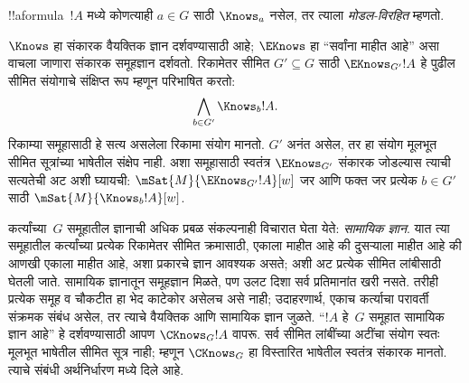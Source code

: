 \documentclass[../../../include/open-logic-section]{subfiles}
\begin{document}
!!a{formula}~$!A$ मध्ये कोणत्याही $a\in G$ साठी
$\Knows_a$ नसेल, तर त्याला \emph{मोडल-विरहित} म्हणतो.

\begin{defn}
  $\Knows$ हा संकारक वैयक्तिक ज्ञान दर्शवण्यासाठी
  आहे; $\EKnows$ हा ``सर्वांना माहीत आहे'' असा
  वाचला जाणारा संकारक समूहज्ञान दर्शवतो. रिकामेतर
  सीमित $G' \subseteq G$ साठी $\EKnows_{G'} !A$ हे
  पुढील सीमित संयोगाचे संक्षिप्त रूप म्हणून परिभाषित करतो:
  \[\bigwedge_{b \in G'} \Knows_b !A.\]
  रिकाम्या समूहासाठी हे सत्य असलेला रिकामा संयोग मानतो.
  $G'$ अनंत असेल, तर हा संयोग मूलभूत सीमित सूत्रांच्या भाषेतील
  संक्षेप नाही. अशा समूहासाठी स्वतंत्र $\EKnows_{G'}$
  संकारक जोडल्यास त्याची सत्यतेची अट अशी घ्यायची:
  $\mSat{M}{\EKnows_{G'} !A}[w]$ जर आणि फक्त जर
  प्रत्येक $b\in G'$ साठी $\mSat{M}{\Knows_b !A}[w]$.
\end{defn}

कर्त्यांच्या~$G$ समूहातील ज्ञानाची अधिक प्रबळ
संकल्पनाही विचारात घेता येते: \emph{सामायिक ज्ञान}.
यात त्या समूहातील कर्त्यांच्या प्रत्येक रिकामेतर सीमित
क्रमासाठी, एकाला माहीत आहे की दुसऱ्याला माहीत आहे की
आणखी एकाला माहीत आहे, अशा प्रकारचे ज्ञान आवश्यक असते;
अशी अट प्रत्येक सीमित लांबीसाठी घेतली जाते.
सामायिक ज्ञानातून समूहज्ञान मिळते, पण उलट दिशा सर्व
प्रतिमानांत खरी नसते. तरीही प्रत्येक समूह व चौकटीत
हा भेद काटेकोर असेलच असे नाही; उदाहरणार्थ, एकाच
कर्त्याचा परावर्ती संक्रमक संबंध असेल, तर त्याचे
वैयक्तिक आणि सामायिक ज्ञान जुळते.
``$!A$ हे~$G$ समूहात सामायिक ज्ञान आहे'' हे
दर्शवण्यासाठी आपण $\CKnows_G !A$ वापरू. सर्व सीमित
लांबींच्या अटींचा संयोग स्वतः मूलभूत भाषेतील सीमित
सूत्र नाही; म्हणून $\CKnows_G$ हा विस्तारित भाषेतील
स्वतंत्र संकारक मानतो. त्याचे संबंधी अर्थनिर्धारण
 मध्ये दिले आहे.
\end{document}
